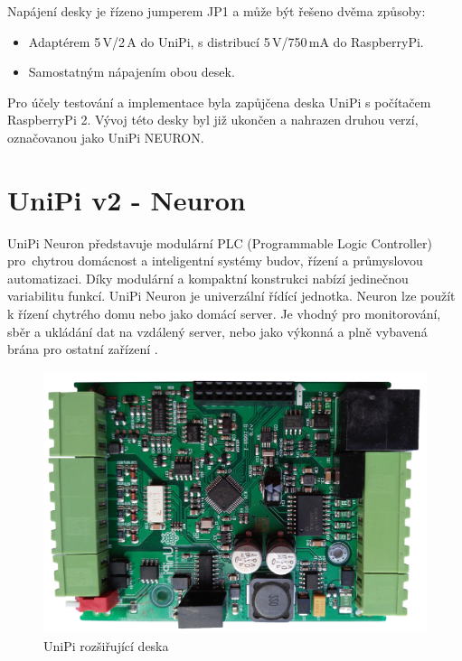 Napájení desky je řízeno jumperem JP1 a může být řešeno dvěma způsoby:
\begin{itemize}
	\item Adaptérem 5\,V/2\,A do UniPi, s distribucí 5\,V/750\,mA do RaspberryPi.
	\item Samostatným nápajením obou desek.
\end{itemize}

\vspace{10pt}
Pro účely testování a implementace byla zapůjčena deska UniPi s počítačem RaspberryPi 2. Vývoj této desky byl již ukončen a nahrazen druhou verzí, označovanou jako UniPi NEURON.




\section{UniPi v2 - Neuron}
\label{KapitolaUnipi2}

UniPi Neuron představuje modulární PLC (Programmable Logic Controller) pro~chytrou domácnost a inteligentní systémy budov, řízení a průmyslovou automatizaci. Díky modulární a kompaktní konstrukci nabízí jedinečnou variabilitu funkcí. UniPi Neuron je univerzální řídící jednotka. Neuron lze použít k řízení chytrého domu nebo jako domácí server. Je vhodný pro monitorování, sběr a ukládání dat na vzdálený server, nebo jako výkonná a plně vybavená brána pro ostatní zařízení \cite{UniPiBoard2}.

 \begin{figure}[!ht]
  \vspace{-30pt}
  \begin{center}
    \includegraphics[scale=0.25]{obrazky/unipi_unipi_deska}
  \end{center}
	\vspace{-20pt}
  \caption{UniPi rozšiřující deska}
	\label{UnipiV2DeskaUnipi}
	\vspace{-10pt}
\end{figure}

